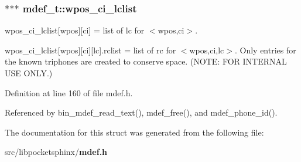 \subsubsection[{wpos\-\_\-ci\-\_\-lclist}]{$\ast$$\ast$$\ast$ mdef\-\_\-t\-::wpos\-\_\-ci\-\_\-lclist}\label{structmdef__t_a5dd5c3d3058a314f4c971a14d1df5f38}


wpos\-\_\-ci\-\_\-lclist[wpos][ci] = list of lc for $<$wpos,ci$>$. 

wpos\-\_\-ci\-\_\-lclist[wpos][ci][lc].rclist = list of rc for $<$wpos,ci,lc$>$. Only entries for the known triphones are created to conserve space. (N\-O\-T\-E\-: F\-O\-R I\-N\-T\-E\-R\-N\-A\-L U\-S\-E O\-N\-L\-Y.) 

Definition at line 160 of file mdef.\-h.



Referenced by bin\-\_\-mdef\-\_\-read\-\_\-text(), mdef\-\_\-free(), and mdef\-\_\-phone\-\_\-id().



The documentation for this struct was generated from the following file\-:\begin{DoxyCompactItemize}
\item 
src/libpocketsphinx/{\bf mdef.\-h}\end{DoxyCompactItemize}
